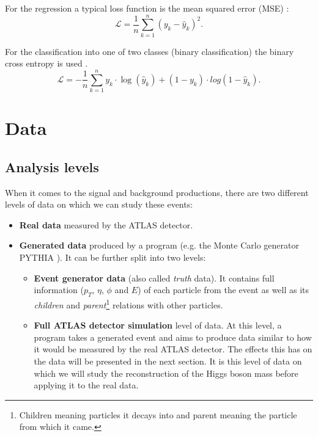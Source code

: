 \documentclass{ctuthesis}
\begin{document}
For the regression a typical loss function is the mean squared error (MSE) \cite[p.176]{data_augmentation}:
\begin{equation}
    \mathcal{L} = \frac{1}{n}\sum_{k=1}^{n}({y}_k-{\hat{y}}_k)^2.
\end{equation}

For the classification into one of two classes (binary classification) the binary cross entropy is used \cite{binary_cross_entropy}.
\begin{equation}
    \mathcal{L} = -\frac{1}{n}\sum_{k=1}^{n} {y}_k\cdot \log(\hat{y}_k) + (1-y_k)\cdot log(1-\hat{y}_k).
\label{bce}
\end{equation}



\chapter{Data}
\section{Analysis levels}
\label{analysis_levels}
When it comes to the signal and background productions, there are two different levels of data on which we can study these events:
\begin{itemize}
    \item \textbf{Real data} measured by the ATLAS detector.
  
    \item \textbf{Generated data} produced by a program (e.g. the Monte Carlo generator PYTHIA \cite{pythia}). It can be further split into two levels:
    \begin{itemize}
    \item \textbf{Event generator data} (also called \emph{truth} data). It contains full information ($p_T$, $\eta$, $\phi$ and $E$) of each particle from the event as well as its \emph{children} and \emph{parent}\footnote{Children meaning particles it decays into and parent meaning the particle from which it came.} relations with other particles.
  
      \item \textbf{Full ATLAS detector simulation} level of data. At this level, a program takes a generated event and aims to produce data similar to how it would be measured by the real ATLAS detector. The effects this has on the data will be presented in the next section. It is this level of data on which we will study the reconstruction of the Higgs boson mass before applying it to the real data.
      \end{itemize}
\end{itemize}
\end{document}
